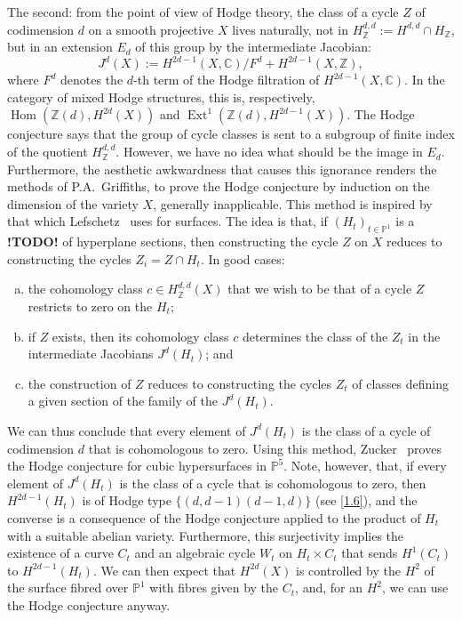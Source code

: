 \documentclass{article}
\theoremstyle{definition}
\newcommand{\ZZ}{\mathbb{Z}}
\newcommand{\CC}{\mathbb{C}}
\newcommand{\PP}{\mathbb{P}}
\DeclareMathOperator{\Hom}{Hom}
\DeclareMathOperator{\Ext}{Ext}
\newcommand{\todo}{\textbf{ !TODO! }}
\begin{document}
The second: from the point of view of Hodge theory, the class of a cycle $Z$ of codimension $d$ on a smooth projective $X$ lives naturally, not in $H_\ZZ^{d,d}:=H^{d,d}\cap H_\ZZ$, but in an extension $E_d$ of this group by the intermediate Jacobian:
\[
  J^d(X) := H^{2d-1}(X,\CC)/F^d + H^{2d-1}(X,\ZZ),
\]
where $F^d$ denotes the $d$-th term of the Hodge filtration of $H^{2d-1}(X,\CC)$.
In the category of mixed Hodge structures, this is, respectively, $\Hom(\ZZ(d),H^{2d}(X))$ and $\Ext^1(\ZZ(d),H^{2d-1}(X))$.
The Hodge conjecture says that the group of cycle classes is sent to a subgroup of finite index of the quotient $H_\ZZ^{d,d}$.
However, we have no idea what should be the image in $E_d$.
Furthermore, the aesthetic awkwardness that causes this ignorance renders the methods of P.A.~Griffiths, to prove the Hodge conjecture by induction on the dimension of the variety $X$, generally inapplicable.
This method is inspired by that which Lefschetz~\cite{24} uses for surfaces.
The idea is that, if $(H_t)_{t\in\PP^1}$ is a \todo of hyperplane sections, then constructing the cycle $Z$ on $X$ reduces to constructing the cycles $Z_i=Z\cap H_t$.
In good cases:
\begin{enumerate}[(a)]
  \item the cohomology class $c\in H_\ZZ^{d,d}(X)$ that we wish to be that of a cycle $Z$ restricts to zero on the $H_t$;
  \item if $Z$ exists, then its cohomology class $c$ determines the class of the $Z_t$ in the intermediate Jacobians $J^d(H_t)$; and
  \item the construction of $Z$ reduces to constructing the cycles $Z_t$ of classes defining a given section of the family of the $J^d(H_t)$.
\end{enumerate}
We can thus conclude that every element of $J^d(H_t)$ is the class of a cycle of codimension $d$ that is cohomologous to zero.
Using this method, Zucker~\cite{32} proves the Hodge conjecture for cubic hypersurfaces in $\PP^5$.
Note, however, that, if every element of $J^d(H_t)$ is the class of a cycle that is cohomologous to zero, then $H^{2d-1}(H_t)$ is of Hodge type $\{(d,d-1)(d-1,d)\}$ (see \cref{1.6}), and the converse is a consequence of the Hodge conjecture applied to the product of $H_t$ with a suitable abelian variety.
Furthermore, this surjectivity implies the existence of a curve $C_t$ and an algebraic cycle $W_t$ on $H_t\times C_t$ that sends $H^1(C_t)$ to $H^{2d-1}(H_t)$.
We can then expect that $H^{2d}(X)$ is controlled by the $H^2$ of the surface fibred over $\PP^1$ with fibres given by the $C_t$, and, for an $H^2$, we can use the Hodge conjecture anyway.
\end{document}
